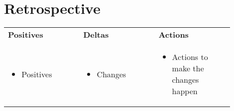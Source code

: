 \section{Retrospective}
\vspace{1em}
\begin{tabular}{| p{0.3\linewidth} | p{0.3\linewidth} | p{0.3\linewidth} |}
\bf Positives & \bf Deltas & \bf Actions \\

\begin{itemize}
\item Positives
\end{itemize}

&
\begin{itemize}
\item Changes
\end{itemize}

&
\begin{itemize}
\item Actions to make the changes happen
\end{itemize}
\end{tabular}

